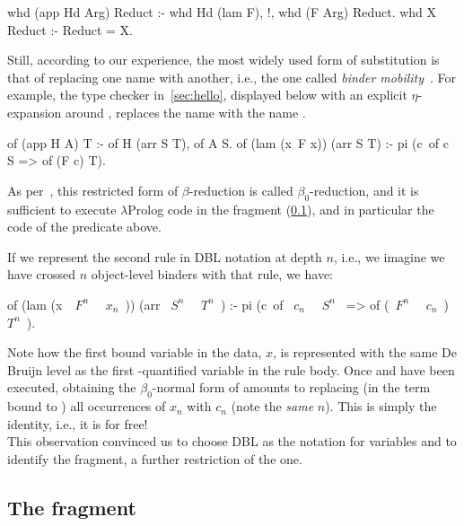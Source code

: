 \documentclass{these-ISSS}
\newenvironment{elpicode}
  {\VerbatimEnvironment\begin{elpibox}\begin{xelpicode}}{\end{xelpicode}
\end{elpibox}}
\begin{document}
\begin{elpicode}
whd (app Hd Arg) Reduct :- whd Hd (lam F), !, whd (F Arg) Reduct.
whd X Reduct :- Reduct = X.
\end{elpicode}


Still, according to our experience, the most widely used form of substitution
is that of replacing one name with another, i.e., the one called
\emph{binder mobility}~\cite{Miller2018MechanizedMR}. For example, the type
checker in~\cref{sec:hello}, displayed below with an explicit
$\eta$-expansion around , replaces the name  with the name
.

\begin{elpicode}
of (app H A) T :- of H (arr S T), of A S.
of (lam (x\ F x)) (arr S T) :- pi (c\ of c S => of (F c) T).
\end{elpicode}

\noindent
As per~\cite{10.1093/logcom/1.4.497}, this restricted form of $\beta$-reduction
is called $\beta_0$-reduction, and it is sufficient to execute $\lambda$Prolog
code in the \theotherfragment fragment (\cref{sec:llam}), and in particular the code of
the  predicate above.


If we represent the second rule in DBL notation at depth $n$, i.e., we imagine
we have crossed $n$ object-level binders with that rule, we have:

\begin{elpicode}
of (lam (x\ ~$F^n$~ ~$x_n$~)) (arr ~$S^n$~ ~$T^n$~) :-
  pi (c\ of ~$c_n$~ ~$S^n$~ => of (~$F^n$~ ~$c_n$~) ~$T^n$~).
\end{elpicode}

\noindent
Note how the first bound variable in the data, $x$, is represented with the
same De Bruijn level as the first -quantified variable in the rule
body. Once  and \elpi{=>} have been executed, obtaining the
$\beta_0$-normal form of  amounts to replacing (in the term
bound to ) all occurrences of $x_n$ with $c_n$ (note the \emph{same}
$n$). This is simply the identity, i.e., it is for free!
~\\

This observation convinced us to choose DBL as the notation for variables and
to identify the \thefragment fragment, a further restriction of the \theotherfragment one.

\subsection{The \theotherfragment fragment}\label{sec:llam}
\end{document}
